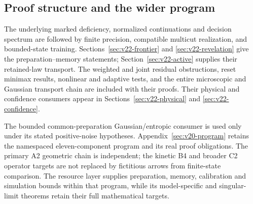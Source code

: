 \subsection{Proof structure and the wider program}
The underlying marked deficiency, normalized continuations and decision
spectrum are followed by finite precision, compatible multicut
realization, and bounded-state training. Sections~\ref{sec:v22-frontier}
and \ref{sec:v22-revelation} give the preparation--memory statements;
Section~\ref{sec:v22-active} supplies their retained-law transport.
The weighted and joint residual obstructions, reset minimax results,
nonlinear and adaptive tests, and the entire microscopic and Gaussian
transport chain are included with their proofs. Their physical and
confidence consumers appear in Sections~\ref{sec:v22-physical} and
\ref{sec:v22-confidence}.

The bounded common-preparation Gaussian/entropic consumer is used only
under its stated positive-noise hypotheses. Appendix~\ref{sec:v20-program}
retains the namespaced eleven-component program and its real proof
obligations. The primary A2 geometric chain is independent; the kinetic
B4 and broader C2 operator targets are not replaced by fictitious
arrows from finite-state comparison. The resource layer supplies
preparation, memory, calibration and simulation bounds within that
program, while its model-specific and singular-limit theorems retain
their full mathematical targets.

